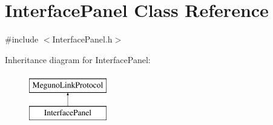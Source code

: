 \hypertarget{class_interface_panel}{\section{Interface\-Panel Class Reference}
\label{class_interface_panel}
}


{\ttfamily \#include $<$Interface\-Panel.\-h$>$}

Inheritance diagram for Interface\-Panel\-:\begin{figure}[H]
\begin{center}
\leavevmode
\includegraphics[height=2.000000cm]{class_interface_panel}
\end{center}
\end{figure}
